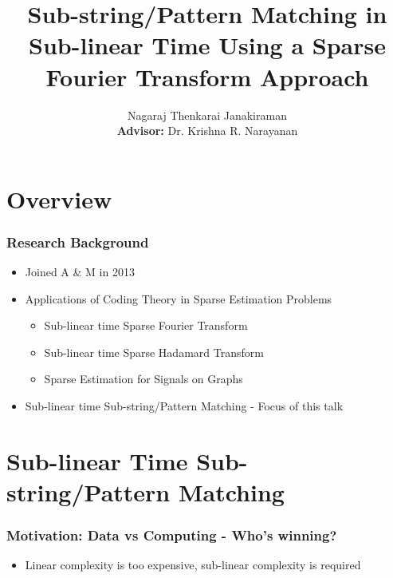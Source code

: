 \documentclass[10pt,xcolor=table]{beamer}
\begin{document}
\title{Sub-string/Pattern Matching in Sub-linear Time Using a Sparse Fourier Transform Approach}
\author{ Nagaraj Thenkarai Janakiraman \\
{\bf Advisor:} Dr. Krishna R. Narayanan \\
}
\date{}
\frame{\titlepage}


\section*{Overview}

\begin{frame}\frametitle{Research Background}
\begin{itemize}\itemsep15pt
	\item Joined A \& M in 2013
	\item Applications of Coding Theory in Sparse Estimation Problems
		\begin{itemize}\itemsep10pt
			\item Sub-linear time Sparse Fourier Transform
			\item Sub-linear time Sparse Hadamard Transform
			\item Sparse Estimation for Signals on Graphs
		\end{itemize}
	\item Sub-linear time Sub-string/Pattern Matching - Focus of this talk
	
\end{itemize}
\end{frame}


\section{Sub-linear Time Sub-string/Pattern Matching}

\begin{frame}\frametitle{Motivation: Data vs Computing - Who's winning?}

\begin{itemize}
	\item Linear complexity is too expensive, sub-linear complexity is required
\end{itemize}

\end{frame}
\end{document}
